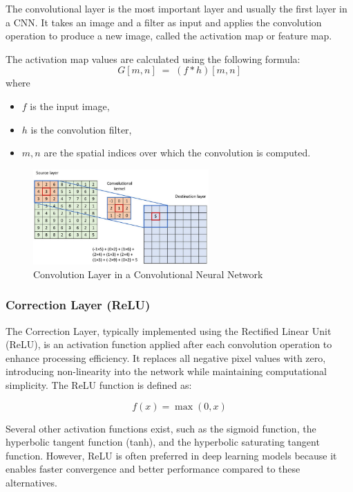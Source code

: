 The convolutional layer is the most important layer and usually the first layer in a CNN. It takes an image and a filter as input and applies the convolution operation to produce a new image, called the activation map or feature map.

The activation map values are calculated using the following formula:
\begin{equation}
  G[m,n] \;=\; (f * h)[m,n]
\end{equation}
where
\begin{itemize}
  \item $f$ is the input image,
  \item $h$ is the convolution filter,
  \item $m,n$ are the spatial indices over which the convolution is computed.

\end{itemize}
\begin{figure}[H]
  \centering
  \includegraphics[width=0.6\textwidth]{Images/Chapter1/conv.png}
  \caption{Convolution Layer in a Convolutional Neural Network \cite{oulmi2018classification}}
  \label{fig:conv}
\end{figure}

\subsubsection{Correction Layer (ReLU)}

The Correction Layer, typically implemented using the Rectified Linear Unit (ReLU), is an activation function applied after each convolution operation to enhance processing efficiency. It replaces all negative pixel values with zero, introducing non-linearity into the network while maintaining computational simplicity. The ReLU function is defined as:

\begin{equation}
  f(x) = \max(0, x)
\end{equation}

Several other activation functions exist, such as the sigmoid function, the hyperbolic tangent function (tanh), and the hyperbolic saturating tangent function. However, ReLU is often preferred in deep learning models because it enables faster convergence and better performance compared to these alternatives.

